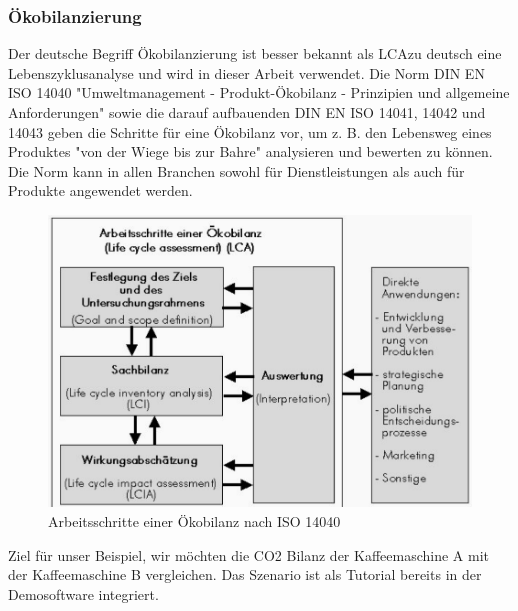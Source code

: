\documentclass[a4paper, 12pt, twoside, BCOR=20mm, DIV=calc, abstracton, parskip=half*, toc=bibliography, toc=listof, headsepline, footsepline, headings=small, numbers=enddot]{scrreprt}
\begin{document}
\subsubsection{Ökobilanzierung}
Der deutsche Begriff Ökobilanzierung ist besser bekannt als \ac{LCA}zu deutsch eine Lebenszyklusanalyse und wird in dieser Arbeit verwendet\cite{klopffer2009okobilanz}.
Die Norm DIN EN ISO 14040 "Umweltmanagement - Produkt-Ökobilanz - Prinzipien und allgemeine Anforderungen" sowie die darauf aufbauenden DIN EN ISO 14041, 14042 und 14043 geben die Schritte für eine Ökobilanz vor, um z. B. den Lebensweg eines Produktes "von der Wiege bis zur Bahre" analysieren und bewerten zu können. Die Norm kann in allen Branchen sowohl für Dienstleistungen als auch für Produkte angewendet werden.
\begin{figure}
\centering
\includegraphics[width=\textwidth]{Bild/ISO 14040 Oekobilanz1.pdf}
\caption{Arbeitsschritte einer Ökobilanz nach ISO 14040\cite{klopffer2009okobilanz}}
\end{figure}
Ziel für unser Beispiel, wir möchten die CO2 Bilanz der Kaffeemaschine A mit der Kaffeemaschine B vergleichen. Das Szenario ist als Tutorial bereits in der Demosoftware integriert.
\end{document}
